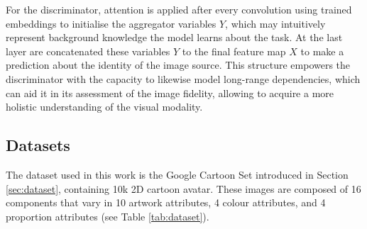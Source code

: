 \documentclass{article}
\begin{document}
	For the discriminator, attention is applied after every convolution using trained embeddings to 
	initialise the aggregator variables $Y$, which may intuitively represent background knowledge the 
	model learns about the task. At the last layer are concatenated these variables $Y$ to the final 
	feature map $X$ to make a prediction about the identity of the image source. 
	This structure empowers the discriminator with the capacity to likewise model long-range 
	dependencies, which can aid it in its assessment of the image fidelity, allowing to acquire a more 
	holistic understanding of the visual modality.
	
	\subsection{Datasets} \label{subsec:app_dataset}
	The dataset used in this work is the Google Cartoon Set \cite{cartoonset} introduced in Section 
	\ref{sec:dataset}, containing 10k 2D cartoon avatar. These images are composed of 16 components 
	that vary in 10 artwork attributes, 4 colour attributes, and 4 proportion attributes (see Table 
	\ref{tab:dataset}). 
	
\end{document}
